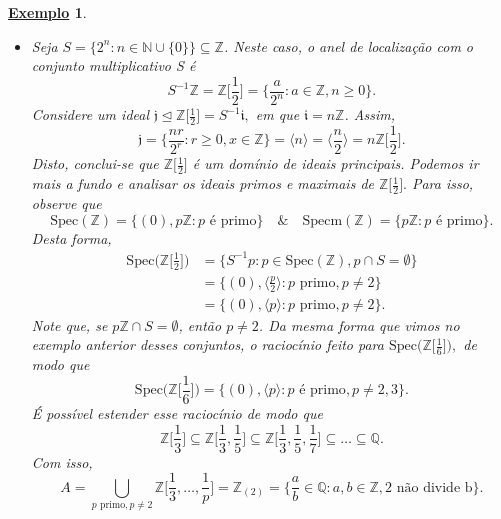 \documentclass{article}
\newtheorem{example}{\underline{Exemplo}}
\begin{document}
   \begin{example}
    \begin{itemize}
      \item[1)] Seja \(S = \{2^{n}: n\in \mathbb{N}\cup\{0\}\}\subseteq \mathbb{Z}\).
    Neste caso, o anel de localização com o conjunto multiplicativo S é 
    \[
      S^{-1}\mathbb{Z} = \mathbb{Z}\biggl[\frac{1}{2}\biggr] = \biggl\{\frac{a}{2^{n}}: a\in \mathbb{Z}, n \geq  0\biggr\}.
    \]
    Considere um ideal \(\mathfrak{j}\trianglelefteq \mathbb{Z}\biggl[\frac{1}{2}\biggr] = S^{-1}\mathfrak{i}, \) em que \(\mathfrak{i} = n \mathbb{Z}\).
Assim, 
    \[
      \mathfrak{j} = \biggl\{\frac{nr}{2^{r}}:r\geq 0, x\in \mathbb{Z}\biggr\} = \langle n \rangle = \langle \frac{n}{2} \rangle = n \mathbb{Z}\biggl[\frac{1}{2}\biggr].
    \]
    Disto, conclui-se que \(\mathbb{Z}\biggl[\frac{1}{2}\biggr]\) é um domínio de ideais principais. Podemos ir mais a fundo e analisar os ideais primos e maximais 
de \(\mathbb{Z}\biggl[\frac{1}{2}\biggr].\) Para isso, observe que 
    \[
      \mathrm{Spec}(\mathbb{Z}) = \{(0), p \mathbb{Z}: p \text{ é primo}\} \quad\&\quad \mathrm{Specm}(\mathbb{Z}) = \{p \mathbb{Z}: p \text{ é primo}\}.
    \]
  Desta forma,
  \begin{align*}
    \mathrm{Spec}\biggl(\mathbb{Z}\biggl[\frac{1}{2}\biggr]\biggr) &= \{S^{-1}p: p\in \mathrm{Spec}(\mathbb{Z}), p\cap S = \emptyset \} \\
                                                                   &= \{(0), \langle \frac{p}{2} \rangle: p\text{ primo}, p \neq 2\}\\
                                                                   &= \{(0), \langle p \rangle: p \text{ primo}, p\neq 2\}.
  \end{align*}
  Note que, se \(p \mathbb{Z}\cap S = \emptyset \), então \(p\neq 2\). Da mesma forma que vimos no exemplo anterior desses conjuntos,
o raciocínio feito para \(\mathrm{Spec}\biggl(\mathbb{Z}\biggl[\frac{1}{6}\biggr]\biggr),\) de modo que 
  \[
    \mathrm{Spec}\biggl(\mathbb{Z}\biggl[\frac{1}{6}\biggr]\biggr) = \{(0), \langle p \rangle: p \text{ é primo}, p\neq 2, 3\}.
  \]
  É possível estender esse raciocínio de modo que 
    \[
      \mathbb{Z}\biggl[\frac{1}{3}\biggr]\subseteq \mathbb{Z}\biggl[\frac{1}{3}, \frac{1}{5}\biggr]\subseteq \mathbb{Z}\biggl[\frac{1}{3}, \frac{1}{5}, \frac{1}{7}\biggr]\subseteq \dotsc \subseteq \mathbb{Q}.
    \]
  Com isso, 
    \[
      A = \bigcup_{p \text{ primo}, p\neq 2}^{}\mathbb{Z}\biggl[\frac{1}{3}, \dotsc , \frac{1}{p}\biggr] = \mathbb{Z}_{(2)} = \biggl\{\frac{a}{b}\in \mathbb{Q}: a, b\in \mathbb{Z}, \text{2 não divide b}\biggr\}.
\]
\end{itemize}
\end{example}
\end{document}
